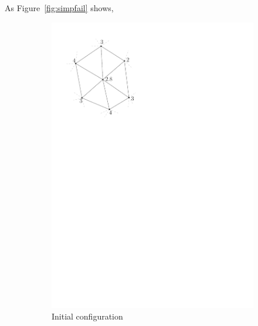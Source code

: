 As Figure~\ref{fig:simpfail} shows, 
\begin{figure}
\centering
  \begin{subfigure}[b]{0.3\linewidth}
    \centering
    \includegraphics[width=\textwidth,page=1]{figs/simpfail.pdf}
    \caption{Initial configuration}\label{fig:simpfail:a}
  \end{subfigure}
  \qquad
  \begin{subfigure}[b]{0.3\linewidth}
    \centering

\end{subfigure}
\end{figure}

